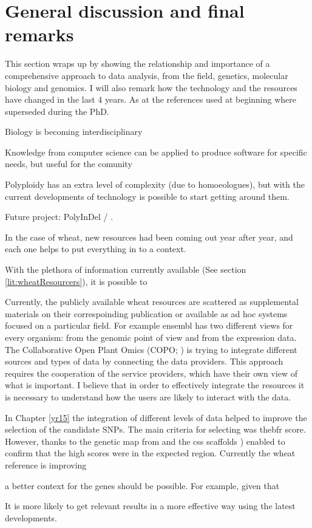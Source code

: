 
\chapter{General discussion and final remarks}
This section wraps up by showing the relationship and importance of a comprehensive approach to data analysis, from the field, genetics, molecular biology and genomics. I will also remark how the technology and the resources have changed in the last 4 years. As at the references used at beginning where superseded during the PhD. 


Biology is becoming interdisciplinary

Knowledge from  computer science can be applied to produce software for specific needs, but useful for the comunity

Polyploidy has an extra level of complexity (due to homoeologues), but with the current developments of technology is possible to start getting around them. 

Future project: PolyInDel / . 

In the case of wheat, new resources had been coming out year after year, and each one helps to put everything in to a context. 

With the plethora of information currently available (See section \ref{lit:wheatResourcers}), it is possible to 

Currently, the publicly available wheat resources are scattered as supplemental materials on their correspoinding publication or available as ad hoc systems focused on a particular field.
For example ensembl has two different views for every organism: from the genomic point of view and from the expression data. 
The Collaborative Open Plant Omics (COPO; \citealt{Davey2015}) is trying to integrate different sources and types of data by connecting the data providers. 
This approach requires the cooperation of the service providers, which have their own view of what is important. 
I believe that in order to effectively integrate the resources it is necessary to understand how the users are likely to interact with the data. 

In Chapter \ref{yr15} the integration of different levels of data helped to improve the selection of the candidate SNPs. 
The main criteria for selecting   was the\acrshort{bfr} score.
However, thanks to the genetic map from \citet{Wang2014} and the \acrshort{css} scaffolds \citep{Mayer2014}) enabled to confirm that the high scores were in the expected region. 
Currently the wheat reference is improving 

 a better context for the genes should be possible. 
For example, given that


It is more likely to get relevant results in a more effective way using the latest developments. 

